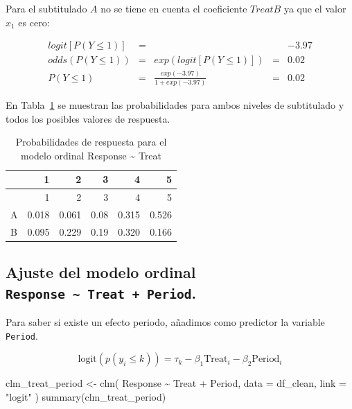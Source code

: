 \documentclass[
  12pt,
  a4paper,
  extrafontsizes,
  onecolumn,
  openright]{memoir}
\newenvironment{Shaded}{\begin{snugshade}}{\end{snugshade}}
\newcommand{\AttributeTok}[1]{\textcolor[rgb]{0.40,0.45,0.13}{#1}}
\newcommand{\FunctionTok}[1]{\textcolor[rgb]{0.28,0.35,0.67}{#1}}
\newcommand{\NormalTok}[1]{\textcolor[rgb]{0.00,0.23,0.31}{#1}}
\newcommand{\OtherTok}[1]{\textcolor[rgb]{0.00,0.23,0.31}{#1}}
\newcommand{\SpecialCharTok}[1]{\textcolor[rgb]{0.37,0.37,0.37}{#1}}
\newcommand{\StringTok}[1]{\textcolor[rgb]{0.13,0.47,0.30}{#1}}
\begin{document}
Para el subtitulado \(A\) no se tiene en cuenta el coeficiente
\(TreatB\) ya que el valor \(x_1\) es cero:

\[
\begin{aligned}
logit [P(Y \le 1)] & = & & & -3.97\\
odds (P(Y \le 1)) & = & exp(logit [P(Y \le 1)]) & = & 0.02 \\
P(Y \le 1) & = & \frac{exp(-3.97)}{1 + exp(-3.97)} & = & 0.02
\end{aligned}
\]

En Tabla~\ref{tbl-probs-clm-treat} se muestran las probabilidades para
ambos niveles de subtitulado y todos los posibles valores de respuesta.

\hypertarget{tbl-probs-clm-treat}{}
\begin{longtable}[]{@{}lrrrrr@{}}
\caption{\label{tbl-probs-clm-treat}Probabilidades de respuesta para el
modelo ordinal Response \textasciitilde{} Treat}\tabularnewline
\toprule\noalign{}
& 1 & 2 & 3 & 4 & 5 \\
\midrule\noalign{}
\endfirsthead
\toprule\noalign{}
& 1 & 2 & 3 & 4 & 5 \\
\midrule\noalign{}
\endhead
\bottomrule\noalign{}
\endlastfoot
A & 0.018 & 0.061 & 0.08 & 0.315 & 0.526 \\
B & 0.095 & 0.229 & 0.19 & 0.320 & 0.166 \\
\end{longtable}

\hypertarget{ajuste-del-modelo-ordinal-response-treat-period.}{%
\subsection{\texorpdfstring{Ajuste del modelo ordinal
\texttt{Response\ \textasciitilde{}\ Treat\ +\ Period}.}{Ajuste del modelo ordinal Response \textasciitilde{} Treat + Period.}}\label{ajuste-del-modelo-ordinal-response-treat-period.}}

Para saber si existe un efecto periodo, añadimos como predictor la
variable \texttt{Period}.

\[
\text{logit}(p(y_i \leq k)) = \tau_k - \beta_1 \text{Treat}_i - \beta_2 \text{Period}_i
\]

\scriptsize

\begin{Shaded}
\begin{Highlighting}[]
\NormalTok{clm\_treat\_period }\OtherTok{\textless{}{-}}
    \FunctionTok{clm}\NormalTok{(}
\NormalTok{        Response }\SpecialCharTok{\textasciitilde{}}\NormalTok{ Treat }\SpecialCharTok{+}\NormalTok{ Period,}
        \AttributeTok{data =}\NormalTok{ df\_clean, }\AttributeTok{link =} \StringTok{"logit"}
\NormalTok{    )}
\FunctionTok{summary}\NormalTok{(clm\_treat\_period)}
\end{Highlighting}
\end{Shaded}
\end{document}
